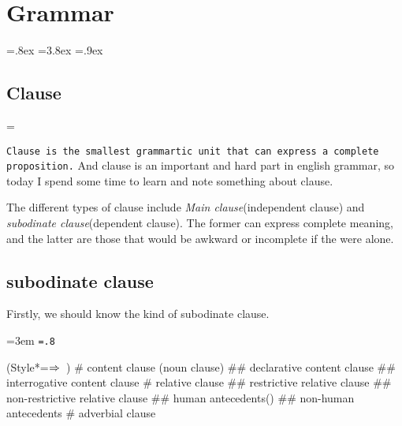 \chapter{Grammar}

\def\pronoun#1{{\tt\colorbox{gray@v}{#1}}}
\long{}
\def\specific#1{{\tt\colorbox{gray@v}{\color{google@green}#1}}}
\def\outs#1{{\tt\colorbox{gray@c}{\color{google@red}#1}}}

\bgroup
\parskip=.8ex\relax
\baselineskip=3.8ex\relax
\lineskip=.9ex\relax

\section{Clause}
\makeatletter
\newbox\b@xbigstar \setbox\b@xbigstar=\hbox{\scalebox{2}{$\star$}}
\def\bigstar{{\copy\b@xbigstar}}
\makeatother

{\tt Clause is the smallest grammartic unit that can express a complete proposition.}
And clause is an important and hard part in english grammar, so today I spend some
time to learn and note something about clause.

The different types of clause include \emph{Main clause}(independent clause) and 
\emph{subodinate clause}(dependent clause).
The former can express complete meaning, and the latter are those that would be
awkward or incomplete if the were alone.

\section{subodinate clause}

Firstly, we should know the kind of subodinate clause.\par
{\leftskip=3em \medskip \tt \baselineskip=.8\baselineskip
\begin{easylist}[checklist]
\ListProperties(Style*=$\Rightarrow\hskip.5em$)
# content clause (noun clause)
## declarative content clause
## interrogative content clause
# relative clause
## restrictive relative clause
## non-restrictive relative clause
## human antecedents()
## non-human antecedents
# adverbial clause
\end{easylist}
}

